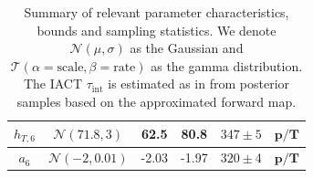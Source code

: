 \begin{table}
\begin{tabular}{ |c||c|c|c|c|c|   }
		$h_{T,6}$ &  $\mathcal{N}(71.8,3)$&62.5 &80.8&$347 \pm 5$&$\bm{p/T}$\\ \hline
		$a_{6}$ & $\mathcal{N}(-2,0.01)$ &-2.03 &-1.97&$320 \pm 4$&$\bm{p/T}$\\
		\hline
	\end{tabular}
	\caption[Summary of relevant parameter characteristics, bounds and sampling statistics.]{Summary of relevant parameter characteristics, bounds and sampling statistics. We denote $\mathcal{N}(\mu,\sigma)$ as the Gaussian and $\mathcal{T}(\alpha = \text{scale}, \beta = \text{rate})$ as the gamma distribution. The IACT $\tau_{\text{int}}$ is estimated as in \cite{UwerrM} from posterior samples based on the approximated forward map.}
	\label{tab:priors}
\end{table}



